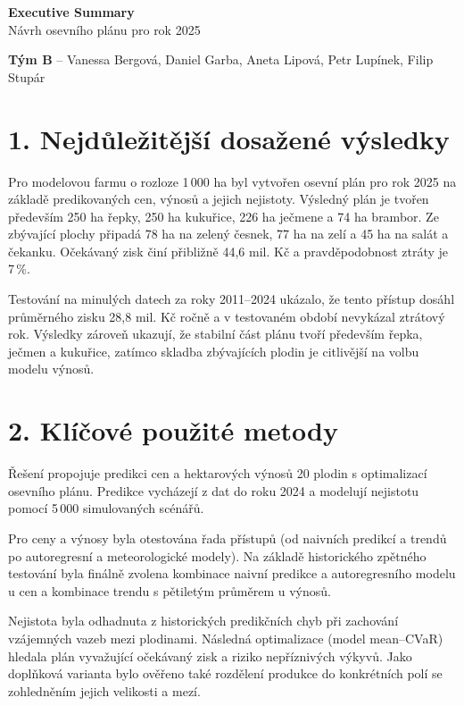 \documentclass[11pt,a4paper]{article}
\begin{document}
\begin{center}
    {\Large\textbf{Executive Summary}}\\[1pt]
    {\normalsize Návrh osevního plánu pro rok 2025}
\end{center}

\begin{center}
    \textbf{Tým B} -- Vanessa Bergová, Daniel Garba, Aneta Lipová, Petr Lupínek, Filip Stupár
\end{center}

\vspace{-0.2cm}

\section*{1. Nejdůležitější dosažené výsledky}

Pro modelovou farmu o rozloze 1\,000 ha byl vytvořen osevní plán pro rok
2025 na základě predikovaných cen, výnosů a jejich nejistoty. Výsledný plán
je tvořen především 250 ha řepky, 250 ha kukuřice, 226 ha ječmene a
74 ha brambor. Ze zbývající plochy připadá 78 ha na zelený
česnek, 77 ha na zelí a 45 ha na salát a čekanku. Očekávaný zisk činí přibližně 44{,}6 mil. Kč a pravděpodobnost ztráty je 7\,\%.

Testování na minulých datech za roky 2011--2024 ukázalo, že tento přístup dosáhl průměrného zisku 28{,}8 mil. Kč ročně a v testovaném období nevykázal
ztrátový rok. Výsledky zároveň ukazují, že stabilní část plánu tvoří
především řepka, ječmen a kukuřice, zatímco skladba zbývajících plodin je citlivější na volbu modelu výnosů.

\vspace{-0.2cm}

\section*{2. Klíčové použité metody}

Řešení propojuje predikci cen a hektarových výnosů 20 plodin s optimalizací osevního plánu. Predikce vycházejí z dat do roku 2024 a modelují nejistotu pomocí 5\,000 simulovaných scénářů.

Pro ceny a výnosy byla otestována řada přístupů (od naivních predikcí a trendů po autoregresní a meteorologické modely). Na základě historického zpětného testování byla finálně zvolena kombinace naivní predikce a autoregresního modelu u cen a kombinace trendu s pětiletým průměrem u výnosů.

Nejistota byla odhadnuta z historických predikčních chyb při zachování vzájemných vazeb mezi plodinami. Následná optimalizace (model mean--CVaR) hledala plán vyvažující očekávaný zisk a riziko nepříznivých výkyvů. Jako doplňková varianta bylo ověřeno také rozdělení produkce do konkrétních polí se zohledněním jejich velikosti a mezí.
\end{document}
